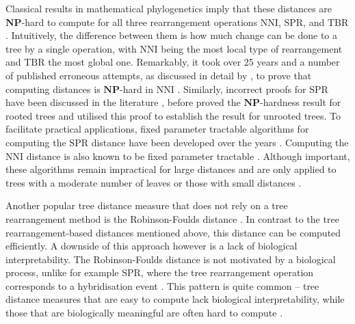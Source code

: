 \documentclass[11pt]{amsart}
\newcommand{\nni}{\mathrm{NNI}}
\newcommand{\spr}{\mathrm{SPR}}
\newcommand{\tbr}{\mathrm{TBR}}
\newcommand{\np}{\mathbf{NP}}
\begin{document}
Classical results in mathematical phylogenetics imply that these distances are $\np$-hard to compute for all three rearrangement operations $\nni$, $\spr$, and $\tbr$ \autocite{Dasgupta2000-xa, Bordewich2005-nx, Hickey2008-wv, Allen2001-ky}.
Intuitively, the difference between them is how much change can be done to a tree by a single operation, with $\nni$ being the most local type of rearrangement and $\tbr$ the most global one.
Remarkably, it took over 25 years and a number of published erroneous attempts, as discussed in detail by \textcite{Dasgupta2000-xa}, to prove that computing distances is $\np$-hard in $\nni$ \autocite{Dasgupta2000-xa}.
Similarly, incorrect proofs for $\spr$ have been discussed in the literature \autocite{Hein1996-em, Allen2001-ky}, before \textcite{Bordewich2005-nx} proved the $\np$-hardness result for rooted trees and \textcite{Hickey2008-wv} utilised this proof to establish the result for unrooted trees.
To facilitate practical applications, fixed parameter tractable algorithms \autocite{Downey2013-nd} for computing the $\spr$ distance have been developed over the years \autocite{Whidden2010-bw, Bordewich2005-nx, Whidden2018-fw}.
Computing the $\nni$ distance is also known to be fixed parameter tractable \autocite{DasGupta1999-xf}.
Although important, these algorithms remain impractical for large distances and are only applied to trees with a moderate number of leaves or those with small distances \autocite{Whidden2018-fw}.

Another popular tree distance measure that does not rely on a tree rearrangement method is the Robinson-Foulds distance \autocite{Robinson1981-fb}.
In contrast to the tree rearrangement-based distances mentioned above, this distance can be computed efficiently.
A downside of this approach however is a lack of biological interpretability.
The Robinson-Foulds distance is not motivated by a biological process, unlike for example $\spr$, where the tree rearrangement operation corresponds to a hybridisation event \autocite{Bordewich2005-nx}.
This pattern is quite common -- tree distance measures that are easy to compute lack biological interpretability, while those that are biologically meaningful are often hard to compute \autocite{Whidden2018-fw}.
\end{document}
